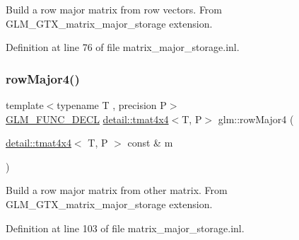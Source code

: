 Build a row major matrix from row vectors. From G\+L\+M\+\_\+\+G\+T\+X\+\_\+matrix\+\_\+major\+\_\+storage extension. 

Definition at line 76 of file matrix\+\_\+major\+\_\+storage.\+inl.

\mbox{\label{group__gtx__matrix__major__storage_ga1a797d9a3f0d6b81e50b4f1bef2ed281}} 
\subsubsection{\texorpdfstring{row\+Major4()}{rowMajor4()}\hspace{0.1cm}{\footnotesize\ttfamily [2/2]}}
{\footnotesize\ttfamily template$<$typename T , precision P$>$ \\
\hyperlink{setup_8hpp_ab2d052de21a70539923e9bcbf6e83a51}{G\+L\+M\+\_\+\+F\+U\+N\+C\+\_\+\+D\+E\+CL} \hyperlink{structglm_1_1detail_1_1tmat4x4}{detail\+::tmat4x4}$<$T, P$>$ glm\+::row\+Major4 (\begin{DoxyParamCaption}\item[{\hyperlink{structglm_1_1detail_1_1tmat4x4}{detail\+::tmat4x4}$<$ T, P $>$ const \&}]{m }\end{DoxyParamCaption})}

Build a row major matrix from other matrix. From G\+L\+M\+\_\+\+G\+T\+X\+\_\+matrix\+\_\+major\+\_\+storage extension. 

Definition at line 103 of file matrix\+\_\+major\+\_\+storage.\+inl.

